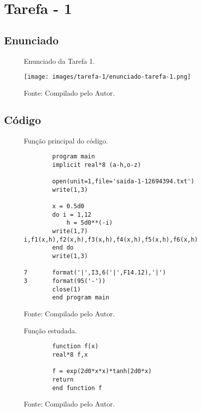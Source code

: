 \chapter*{Tarefa - 1}

\section*{Enunciado}

\begin{figure}[H]
\centering
\caption{Enunciado da Tarefa 1.}
\centering
\texttt{[image: images/tarefa-1/enunciado-tarefa-1.png]}
\caption*{Fonte: Compilado pelo Autor.}
\label{fig:tarefa 1 - Enunciado}
\end{figure}

\section*{Código}


\vspace*{1\baselineskip}

\begin{figure}[H]
\centering
\caption{Função principal do código.}
\centering

\begin{lstlisting}
        program main
        implicit real*8 (a-h,o-z)

        open(unit=1,file='saida-1-12694394.txt')
        write(1,3)

        x = 0.5d0
        do i = 1,12
            h = 5d0**(-i)
        write(1,7) i,f1(x,h),f2(x,h),f3(x,h),f4(x,h),f5(x,h),f6(x,h)
        end do
        write(1,3)

7       format('|',I3,6('|',F14.12),'|')
3       format(95('-'))
        close(1)
        end program main
\end{lstlisting}

\caption*{Fonte: Compilado pelo Autor.}
\label{fig:tarefa 1 - função principal do código}
\end{figure}

\vspace*{1\baselineskip}

\begin{figure}[H]
\centering
\caption{Função estudada.}
\centering

\begin{lstlisting}
        function f(x)
        real*8 f,x
        
        f = exp(2d0*x*x)*tanh(2d0*x)
        return
        end function f
\end{lstlisting}

\caption*{Fonte: Compilado pelo Autor.}
\label{fig:tarefa 1 - função f}
\end{figure}



